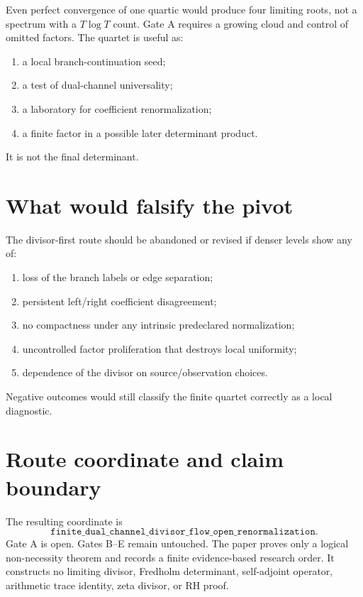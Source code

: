 \documentclass[12pt]{article}
\theoremstyle{remark}\newtheorem{remark}[theorem]{Remark}
\begin{document}
Even perfect convergence of one quartic would produce four limiting roots,
not a spectrum with a $T\log T$ count.  Gate A requires a growing cloud and
control of omitted factors.  The quartet is useful as:
\begin{enumerate}[leftmargin=2em]
\item a local branch-continuation seed;
\item a test of dual-channel universality;
\item a laboratory for coefficient renormalization;
\item a finite factor in a possible later determinant product.
\end{enumerate}
It is not the final determinant.

\section{What would falsify the pivot}

The divisor-first route should be abandoned or revised if denser levels show
any of:
\begin{enumerate}[leftmargin=2em]
\item loss of the branch labels or edge separation;
\item persistent left/right coefficient disagreement;
\item no compactness under any intrinsic predeclared normalization;
\item uncontrolled factor proliferation that destroys local uniformity;
\item dependence of the divisor on source/observation choices.
\end{enumerate}
Negative outcomes would still classify the finite quartet correctly as a
local diagnostic.

\section{Route coordinate and claim boundary}

The resulting coordinate is
\begin{equation*}
 \boxed{\texttt{finite\_dual\_channel\_divisor\_flow\_open\_renormalization}}.
\end{equation*}
Gate A is open.  Gates B--E remain untouched.  The paper proves only a
logical non-necessity theorem and records a finite evidence-based research
order.  It constructs no limiting divisor, Fredholm determinant,
self-adjoint operator, arithmetic trace identity, zeta divisor, or RH proof.


\end{document}
